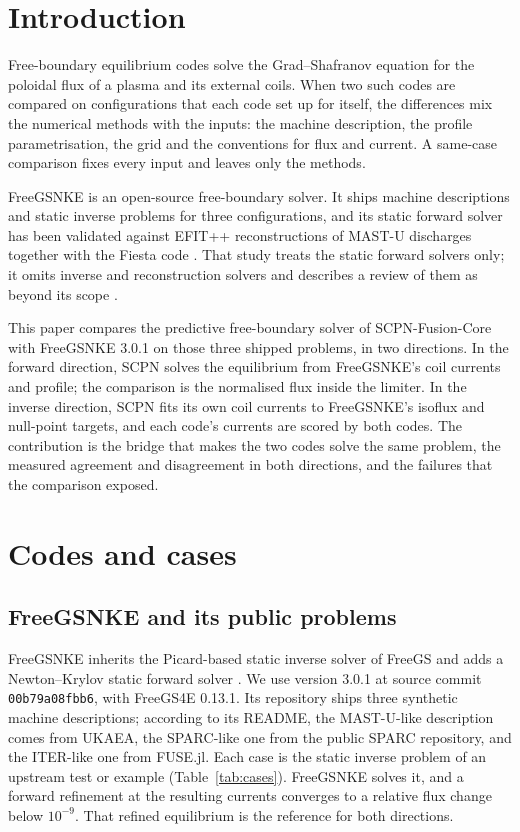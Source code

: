 \documentclass[11pt]{article}
\begin{document}
\section{Introduction}

Free-boundary equilibrium codes solve the Grad--Shafranov equation
\citep{GradRubin1958,Shafranov1958} for the poloidal flux of a plasma and its
external coils.  When two such codes are compared on configurations that each
code set up for itself, the differences mix the numerical methods with the
inputs: the machine description, the profile parametrisation, the grid and the
conventions for flux and current.  A same-case comparison fixes every input and
leaves only the methods.

FreeGSNKE \citep{Amorisco2024} is an open-source free-boundary solver.  It
ships machine descriptions and static inverse problems for three
configurations, and its static forward solver has been validated against
EFIT++ reconstructions of MAST-U discharges together with the Fiesta code
\citep{Pentland2025}.  That study treats the static forward solvers only; it
omits inverse and reconstruction solvers and describes a review of them as
beyond its scope \citep{Pentland2025}.

This paper compares the predictive free-boundary solver of SCPN-Fusion-Core
with FreeGSNKE 3.0.1 on those three shipped problems, in two directions.  In
the forward direction, SCPN solves the equilibrium from FreeGSNKE's coil
currents and profile; the comparison is the normalised flux inside the limiter.
In the inverse direction, SCPN fits its own coil currents to FreeGSNKE's
isoflux and null-point targets, and each code's currents are scored by both
codes.  The contribution is the bridge that makes the two codes solve the same
problem, the measured agreement and disagreement in both directions, and the
failures that the comparison exposed.

\section{Codes and cases}

\subsection{FreeGSNKE and its public problems}

FreeGSNKE inherits the Picard-based static inverse solver of FreeGS
\citep{Dudson2024} and adds a Newton--Krylov static forward solver
\citep{Amorisco2024,Pentland2025}.  We use version 3.0.1 at source commit
\texttt{00b79a08fbb6}, with FreeGS4E 0.13.1.  Its repository ships three
synthetic machine descriptions; according to its README, the MAST-U-like
description comes from UKAEA, the SPARC-like one from the public SPARC
repository, and the ITER-like one from FUSE.jl.  Each case is the static inverse
problem of an upstream test or example (Table~\ref{tab:cases}).  FreeGSNKE
solves it, and a forward refinement at the resulting currents converges to a
relative flux change below $10^{-9}$.  That refined equilibrium is the reference
for both directions.
\end{document}
